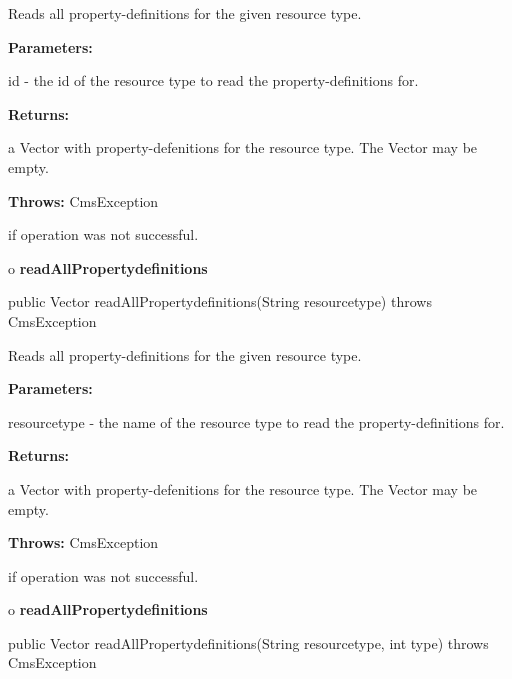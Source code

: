 \begin{description}
\htmlDD Reads all property-definitions for the given resource type.

\begin{description}
\item {\bf Parameters:}

id - the id of the resource type to read the property-definitions for.
\item {\bf Returns:}

a Vector with property-defenitions for the resource type. The Vector may be
empty.
\item {\bf Throws:} CmsException

if operation was not successful.
\end{description}

\end{description}

o {\bf readAllPropertydefinitions}

\begin{PRE}
 public Vector readAllPropertydefinitions(String resourcetype) throws CmsException
\end{PRE}

\begin{description}
\htmlDD Reads all property-definitions for the given resource type.

\begin{description}
\item {\bf Parameters:}

resourcetype - the name of the resource type to read the property-definitions
for.
\item {\bf Returns:}

a Vector with property-defenitions for the resource type. The Vector may be
empty.
\item {\bf Throws:} CmsException

if operation was not successful.
\end{description}

\end{description}

o {\bf readAllPropertydefinitions}

\begin{PRE}
 public Vector readAllPropertydefinitions(String resourcetype,
                                          int type) throws CmsException
\end{PRE}

